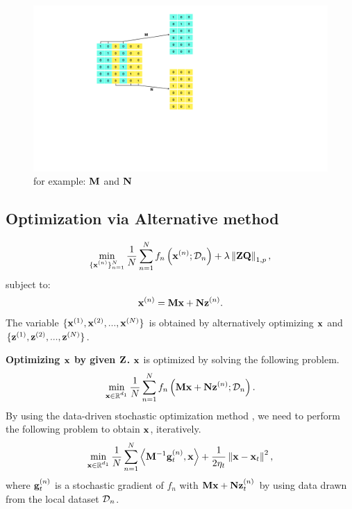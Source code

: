 \documentclass[journal]{IEEEtran}
\begin{document}
\begin{figure}[!t]
\setlength{\abovecaptionskip}{0pt}
\setlength{\belowcaptionskip}{0pt}
\centering 
\includegraphics[width=0.97\columnwidth]{figs/figs_MNmatrix}
\caption{for example: ${\bf M}$ and ${\bf N}$ }
\label{figure_xxx}
\end{figure}


\subsection{Optimization via Alternative method}

\begin{align}
\min_{\substack{\{{\bf x}^{(n)}\}_{n=1}^N}} \frac{1}{N}\sum_{n=1}^N f_n\left( {\bf x}^{(n)}; \mathcal{D}_n \right) + \lambda \left\lVert{\bf Z}{\bf Q}\right\rVert_{1,p},
\end{align} subject to:
\begin{align}
{\bf x}^{(n)} = {\bf M}{\bf x} + {\bf N} {\bf z}^{(n)}.
\end{align}
The variable $\{{\bf x}^{(1)}, {\bf x}^{(2)}, ..., {\bf x}^{(N)}\}$ is obtained by alternatively optimizing ${\bf x}$ and $\{{\bf z}^{(1)}, {\bf z}^{(2)}, ..., {\bf z}^{(N)}\}$.

\textbf{Optimizing ${\bf x}$ by given ${\bf Z}$.} ${\bf x}$ is optimized by solving the following problem.
\begin{align}
\min_{\substack{{\bf x}\in\mathbb{R}^{d_1}}} \frac{1}{N}\sum_{n=1}^N f_n\left( {\bf M}{\bf x} + {\bf N} {\bf z}^{(n)}; \mathcal{D}_n \right).
\end{align} By using the data-driven stochastic optimization method \cite{dd}, we need to perform the following problem to obtain ${\bf x}$, iteratively.
\begin{align}
\nonumber
\min_{\substack{{\bf x}\in\mathbb{R}^{d_1}}} \frac{1}{N}\sum_{n=1}^N \left\langle{\bf M}^{-1}{\bf g}_t^{(n)}, {\bf x} \right\rangle + \frac{1}{2\eta_t}\left\lVert{\bf x} - {\bf x}_t\right\rVert^2,
\end{align} where ${\bf g}_t^{(n)}$ is a stochastic gradient of $f_n$ with ${\bf M}{\bf x} + {\bf N} {\bf z}_t^{(n)}$ by using data drawn from the local dataset $\mathcal{D}_n$.
\end{document}
